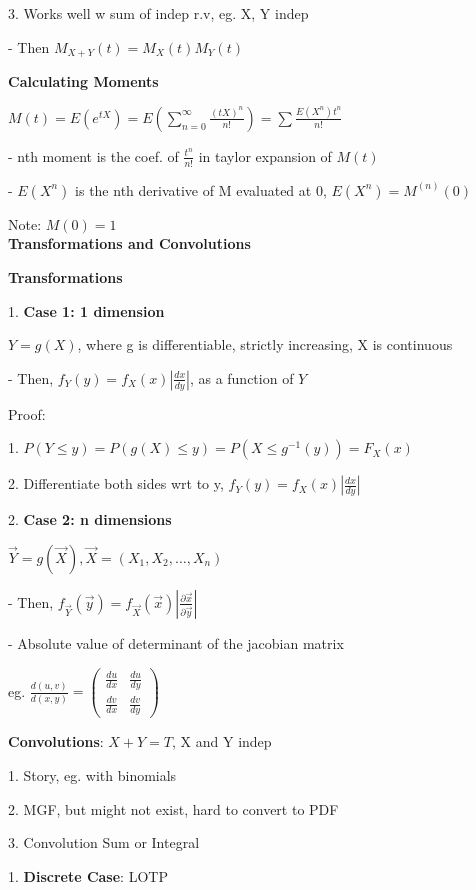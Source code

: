 \documentclass[10pt, a4paper]{article}
\newcommand{\red}[1]{{\color{red}#1}}
\newcommand{\header}[1]{{\normalsize\textbf{#1}}}
\newcommand{\tab}[0]{\hspace*{2mm}}
\begin{document}
\begin{multicols*}{3}
		3. Works well w sum of indep r.v, eg. X, Y indep

		\tab{} - Then $M_{X + Y}(t) = M_X(t)M_Y(t)$

		\textbf{Calculating Moments}

		$M(t) = E(e^{tX}) = E(\sum_{n = 0}^{\infty} \frac{(tX)^n}{n!}) = \sum \frac{E(X^n) t^n}{n!}$

		- nth moment is the coef. of $\frac{t^n}{n!}$ in taylor expansion of $M(t)$

		- $E(X^n)$ is the nth derivative of M evaluated at 0, $E(X^n) = M^{(n)}(0)$ 

		\red{Note}: $M(0) = 1$\\

		\header{Transformations and Convolutions}

		\textbf{Transformations}

		1. \textbf{Case 1: 1 dimension}

		$Y = g(X)$, where g is differentiable, strictly increasing, X is continuous

		\tab{} - Then, $f_Y(y) = f_X(x) |\frac{dx}{dy}|$, as a function of $Y$

		Proof: 
		
		1. $P(Y \leq y) = P(g(X) \leq y) = P(X \leq g^{-1}(y)) = F_X(x)$

		2. Differentiate both sides wrt to y, $f_Y(y) = f_X(x) |\frac{dx}{dy}|$

		2. \textbf{Case 2: n dimensions}

		$\vec{Y} = g(\vec{X}), \vec{X} = (X_1, X_2, \dots, X_n)$

		\tab{} - Then, $f_{\vec{Y}}(\vec{y}) = f_{\vec{X}}(\vec{x}) |\frac{\partial \vec{x}}{\partial \vec{y}}|$

		\tab{} - Absolute value of determinant of the jacobian matrix

		eg. $\frac{d(u, v)}{d(x, y)} = \left(
		\begin{matrix}
			\frac{du}{dx} & \frac{du}{dy} \\
			\frac{dv}{dx} & \frac{dv}{dy}
		\end{matrix}\right)$
		
		\textbf{Convolutions}: $X + Y = T$, X and Y indep

		1. Story, eg. with binomials

		2. MGF, but might not exist, hard to convert to PDF

		3. Convolution Sum or Integral

		1. \textbf{Discrete Case}: LOTP


\end{multicols*}
\end{document}
